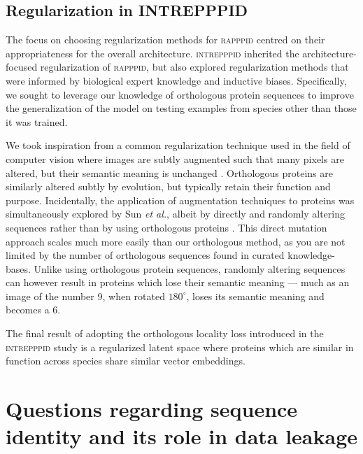 \subsection*{Regularization in INTREPPPID}

The focus on choosing regularization methods for \textsc{rapppid} centred on their appropriateness for the overall architecture. \textsc{intrepppid} inherited the architecture-focused regularization of \textsc{rapppid}, but also explored regularization methods that were informed by biological expert knowledge and inductive biases. Specifically, we sought to leverage our knowledge of orthologous protein sequences to improve the generalization of the model on testing examples from species other than those it was trained. 

We took inspiration from a common regularization technique used in the field of computer vision where images are subtly augmented such that many pixels are altered, but their semantic meaning is unchanged \cite{image_augmentation}. Orthologous proteins are similarly altered subtly by evolution, but typically retain their function and purpose. Incidentally, the application of augmentation techniques to proteins was simultaneously explored by Sun \textit{et al.}, albeit by directly and randomly altering sequences rather than by using orthologous proteins \cite{protein_augmentation}. This direct mutation approach scales much more easily than our orthologous method, as you are not limited by the number of orthologous sequences found in curated knowledge-bases. Unlike using orthologous protein sequences, randomly altering sequences can however result in proteins which lose their semantic meaning --- much as an image of the number 9, when rotated $180^{\circ}$, loses its semantic meaning and becomes a 6.

The final result of adopting the orthologous locality loss introduced in the \textsc{intrepppid} study is a regularized latent space where proteins which are similar in function across species share similar vector embeddings.

\section*{Questions regarding sequence identity and its role in data leakage}

